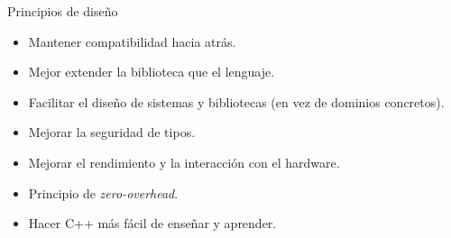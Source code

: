 
\begin{frame}{Principios de diseño}
\begin{itemize}
  \item \pause  Mantener compatibilidad hacia atrás.
  \item \pause  Mejor extender la biblioteca que el lenguaje.
  \item \pause  Facilitar el diseño de sistemas y bibliotecas (en vez de dominios concretos).
  \item \pause  Mejorar la seguridad de tipos.
  \item \pause  Mejorar el rendimiento y la interacción con el hardware.
  \item \pause  Principio de \emph{zero-overhead}.
  \item \pause  Hacer C++ más fácil de enseñar y aprender.
\end{itemize}
\end{frame}

